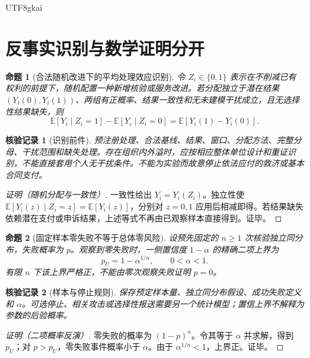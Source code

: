 \documentclass[12pt,a4paper,openany]{report}
\newtheorem{proposition}{命题}[chapter]
\newtheorem{Certificate}{核验记录}[chapter]
\newcommand{\EE}{\mathbb E}
\begin{document}
\begin{CJK*}{UTF8}{gkai}
\section{反事实识别与数学证明分开}
\begin{proposition}[合法随机改进下的平均处理效应识别]
\label{prop:ate}
令 $Z_i\in\{0,1\}$ 表示在不削减已有权利的前提下，随机配置一种新增核验或服务改进。若分配独立于潜在结果 $(Y_i(0),Y_i(1))$、两组有正概率、结果一致性和无未建模干扰成立，且无选择性结果缺失，则
\[
 \EE[Y_i\mid Z_i=1]-\EE[Y_i\mid Z_i=0]
 =\EE[Y_i(1)-Y_i(0)].
\]
\end{proposition}
\begin{Certificate}[识别前件]
预注册处理、合法基线、结果、窗口、分配方法、完整分母、干扰范围和缺失处理。存在组织内外溢时，应按相应整体单位设计和重证识别，不能直接套用个人无干扰条件。不能为实验而故意停止依法应付的救济或基本合同支付。
\end{Certificate}
\begin{proof}[证明（随机分配与一致性）]
一致性给出 $Y_i=Y_i(Z_i)$。独立性使 $\EE[Y_i(z)\mid Z_i=z]=\EE[Y_i(z)]$，分别对 $z=0,1$ 应用后相减即得。若结果缺失依赖潜在支付或申诉结果，上述等式不再由已观察样本直接得到。证毕。
\end{proof}

\begin{proposition}[固定样本零失败不等于总体零风险]
\label{prop:zero-failure}
设预先固定的 $n\ge1$ 次核验独立同分布，失败概率为 $p$。观察到零失败时，一侧置信度 $1-\alpha$ 的精确二项上界为
\[
 p_U=1-\alpha^{1/n},\qquad 0<\alpha<1.
\]
有限 $n$ 下该上界严格正，不能由零次观察失败证明 $p=0$。
\end{proposition}
\begin{Certificate}[样本与停止规则]
保存预定样本量、独立同分布假设、成功失败定义和 $\alpha$。可选停止、相关攻击或选择性报送需要另一个统计模型；置信上界不解释为参数的后验概率。
\end{Certificate}
\begin{proof}[证明（二项概率反演）]
零失败的概率为 $(1-p)^n$。令其等于 $\alpha$ 并求解，得到 $p_U$；对 $p>p_U$，零失败事件概率小于 $\alpha$。由于 $\alpha^{1/n}<1$，上界正。证毕。
\end{proof}


\end{CJK*}
\end{document}
